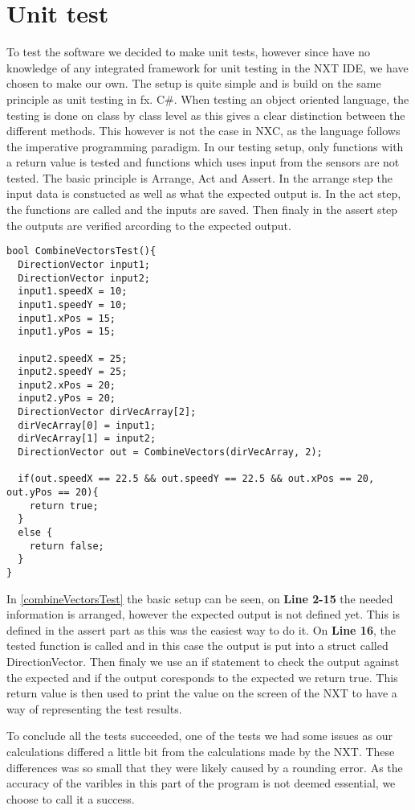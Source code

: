 \section{Unit test}

To test the \name software we decided to make unit tests, however since have no
knowledge of any integrated framework for unit testing in the NXT IDE, we
have chosen to make our own. The setup is quite simple and is build on the same
principle as unit testing in fx. C\#. When testing an object oriented
language, the testing is done on class by class level as this gives a clear
distinction between the different methods. This however is not the case in NXC,
as the language follows the imperative programming paradigm. In our testing
setup, only functions with a return value is tested and functions which uses
input from the sensors are not tested. The basic principle is Arrange, Act and
Assert. In the arrange step the input data is constucted as well as what the
expected output is. In the act step, the functions are called and the inputs are
saved. Then finaly in the assert step the outputs are verified arcording to the
expected output. \nl

\begin{minipage}[H]{\linewidth}
\begin{lstlisting}[caption =Unit Test for Combine Vectors,label=combineVectorsTest] 
bool CombineVectorsTest(){
  DirectionVector input1;
  DirectionVector input2;
  input1.speedX = 10;
  input1.speedY = 10;
  input1.xPos = 15;
  input1.yPos = 15;
  
  input2.speedX = 25;
  input2.speedY = 25;
  input2.xPos = 20;
  input2.yPos = 20;
  DirectionVector dirVecArray[2];
  dirVecArray[0] = input1;
  dirVecArray[1] = input2;
  DirectionVector out = CombineVectors(dirVecArray, 2);
  
  if(out.speedX == 22.5 && out.speedY == 22.5 && out.xPos == 20, out.yPos == 20){
    return true;
  }
  else {
    return false;
  }
}
\end{lstlisting}
\end{minipage}

In \autoref{combineVectorsTest} the basic setup can be seen, on \textbf{Line
2-15} the needed information is arranged, however the expected output is not
defined yet. This is defined in the assert part as this was the easiest way to
do it. On \textbf{Line 16}, the tested function is called and in this case the
output is put into a struct called DirectionVector. Then finaly we use an if
statement to check the output against the expected and if the output coresponds
to the expected we return true. This return value is then used to print the
value on the screen of the NXT to have a way of representing the test results.
\nl

To conclude all the tests succeeded, one of the tests we had some issues as our
calculations differed a little bit from the calculations made by the NXT. These
differences was so small that they were likely caused by a rounding error. As
the accuracy of the varibles in this part of the program is not deemed
essential, we choose to call it a success.
